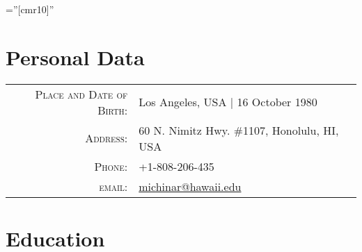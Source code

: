 \documentclass[a4paper,10pt]{article} %
\begin{document}
\pagestyle{empty} %

\font\fb=''[cmr10]'' %


\par{\bigskip\par} %

\section{Personal Data}

\begin{tabular}{rl}
\textsc{Place and Date of Birth:} & Los Angeles, USA  | 16 October 1980\\
\textsc{Address:} & 60 N. Nimitz Hwy. \#1107, Honolulu, HI, USA\\
\textsc{Phone:} & +1-808-206-435\\
\textsc{email:} & \href{mailto:michinar@hawaii.edu}{michinar@hawaii.edu}
\end{tabular}


\section{Education}
\end{document}
